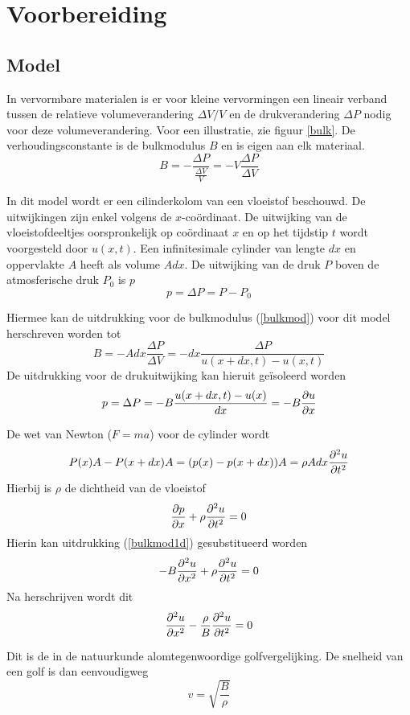 \section{Voorbereiding}
\subsection{Model}

In vervormbare materialen is er voor kleine vervormingen een lineair 
verband tussen de relatieve volumeverandering $\Delta V/V$ en de 
drukverandering $\Delta P$ nodig voor deze volumeverandering. Voor een 
illustratie, zie figuur \ref{bulk}.  De verhoudingsconstante is de bulkmodulus 
$B$ en is eigen aan elk materiaal.
\begin{equation}
\label{bulkmod}
B = -\frac{\Delta P}{\frac{\Delta V}{V}} = - V \frac{\Delta P}{\Delta V}
\end{equation}

In dit model wordt er een cilinderkolom van een vloeistof beschouwd. De 
uitwijkingen zijn enkel volgens de $x$-co\"ordinaat. De uitwijking van de 
vloeistofdeeltjes oorspronkelijk op co\"ordinaat $x$ en op het tijdstip $t$ 
wordt voorgesteld door $u(x,t)$. Een infinitesimale cylinder van lengte $dx$ en 
oppervlakte $A$ heeft als volume $A dx$.  De uitwijking van de druk $P$ boven 
de atmosferische druk $P_0$ is $p$
$$
p = \Delta P = P - P_0
$$

Hiermee kan de uitdrukking voor de bulkmodulus (\ref{bulkmod}) voor dit model 
herschreven worden tot
$$
B = -A dx \frac{\Delta P}{\Delta V} = -dx \frac{\Delta P}{ u(x+dx,t)-u(x,t)}
$$
De uitdrukking voor de drukuitwijking kan hieruit ge\"isoleerd worden
\begin{equation}
\label{bulkmod1d}
p = \Delta P = -B \frac{u(x+dx,t)-u(x)}{dx} = -B \frac{\partial u}{\partial x}
\end{equation}

De wet van Newton ($F = ma$) voor de cylinder wordt
$$
P(x)A - P(x+dx)A = (p(x) - p(x+dx))A = \rho A dx \frac{\partial^2 u}{\partial t^2}
$$
Hierbij is $\rho$ de dichtheid van de vloeistof
$$
\frac{\partial p}{\partial x} + \rho \frac{\partial^2 u}{\partial t^2} = 0
$$
Hierin kan uitdrukking (\ref{bulkmod1d}) gesubstitueerd worden
$$
-B\frac{\partial^2 u}{\partial x^2} + \rho \frac{\partial^2 u}{\partial t^2} = 0
$$
Na herschrijven wordt dit
\begin{equation}
\label{waveeq}
\frac{\partial^2 u}{\partial x^2} - \frac{\rho}{B} \frac{\partial^2 u}{\partial t^2} = 0
\end{equation}

Dit is de in de natuurkunde alomtegenwoordige golfvergelijking. De snelheid 
van een golf is dan eenvoudigweg
\begin{equation}
\label{speedofsound}
v = \sqrt{\frac{B}{\rho}}
\end{equation}


